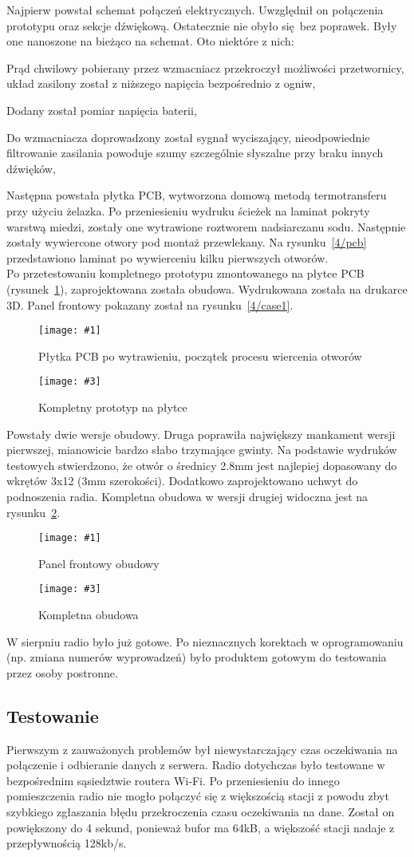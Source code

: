 \documentclass[polish]{aghengthesis}
\let\tempone\itemize
\let\temptwo\enditemize
\renewenvironment{itemize}{\tempone\setlength{\itemsep}{0cm}}{\temptwo}
\newcommand{\imgintss}[5]{
	\begin{figure}[{#5}]
		\centering
		\begin{minipage}{.45\textwidth}
			\centering
			\texttt{[image: \#1]}
			\caption{#2}
			\label{#1}
		\end{minipage}%
		\hfill
		\begin{minipage}{.45\textwidth}
			\centering
			\texttt{[image: \#3]}
			\caption{#4}
			\label{#3}
		\end{minipage}
	\end{figure}
}
\newcommand{\imghss}[4]{\imgintss{#1}{#2}{#3}{#4}{H}}
\begin{document}
			Najpierw powstał schemat połączeń elektrycznych. Uwzględnił on połączenia prototypu oraz sekcje dźwiękową. Ostatecznie nie obyło się bez poprawek. Były one nanoszone na bieżąco na schemat. Oto niektóre z nich:
			\begin{itemize}
				\item Prąd chwilowy pobierany przez wzmacniacz przekroczył możliwości przetwornicy, układ zasilony został z niższego napięcia bezpośrednio z ogniw,
				\item Dodany został pomiar napięcia baterii,
				\item Do wzmacniacza doprowadzony został sygnał wyciszający, nieodpowiednie filtrowanie zasilania powoduje szumy szczególnie słyszalne przy braku innych dźwięków,
			\end{itemize}
			
			Następna powstała płytka PCB, wytworzona domową metodą termotransferu przy użyciu żelazka\textsuperscript{\cite{ch4_pcb_method}}. Po przeniesieniu wydruku ścieżek na laminat pokryty warstwą miedzi, zostały one wytrawione roztworem nadsiarczanu sodu. Następnie zostały wywiercone otwory pod montaż przewlekany. Na rysunku~\ref{4/pcb} przedstawiono laminat po wywierceniu kilku pierwszych otworów.
			$ $\\
			
			Po przetestowaniu kompletnego prototypu zmontowanego na płytce PCB (rysunek~\ref{4/prototype_3}), zaprojektowana została obudowa. Wydrukowana została na drukarce 3D. Panel frontowy pokazany został na rysunku~\ref{4/case1}.

			\imghss{4/pcb}{Płytka PCB po wytrawieniu, początek procesu wiercenia otworów}{4/prototype_3}{Kompletny prototyp na płytce}
			
			Powstały dwie wersje obudowy. Druga poprawiła największy mankament wersji pierwszej, mianowicie bardzo słabo trzymające gwinty. Na podstawie wydruków testowych stwierdzono, że otwór o średnicy 2.8mm jest najlepiej dopasowany do wkrętów 3x12 (3mm szerokości). Dodatkowo zaprojektowano uchwyt do podnoszenia radia. Kompletna obudowa w wersji drugiej widoczna jest na rysunku~\ref{4/case2}.
			
			\imghss{4/case1}{Panel frontowy obudowy}{4/case2}{Kompletna obudowa}
			
			W sierpniu radio było już gotowe. Po nieznacznych korektach w oprogramowaniu (np. zmiana numerów wyprowadzeń) było produktem gotowym do testowania przez osoby postronne.

		\subsection{Testowanie}
			Pierwszym z zauważonych problemów był niewystarczający czas oczekiwania na połączenie i odbieranie danych z serwera. Radio dotychczas było testowane w bezpośrednim sąsiedztwie routera Wi-Fi. Po przeniesieniu do innego pomieszczenia radio nie mogło połączyć się z większością stacji z powodu zbyt szybkiego zgłaszania błędu przekroczenia czasu oczekiwania na dane. Został on powiększony do 4 sekund, ponieważ bufor ma 64kB, a większość stacji nadaje z przepływnością 128kb/s.
			$ $\\
			
\end{document}
